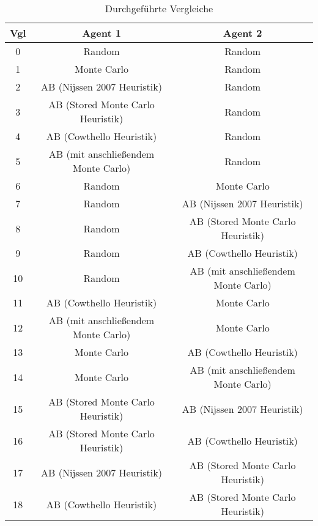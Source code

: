 \begin{table}[ht]
\begin{adjustbox}{max width=\textwidth}
\begin{tabular}{| c | c | c |} \hline
\ac{Vgl} & Agent 1 & Agent 2 \\ \hline
\hline
0  & Random                              & Random                              \\ \hline
\hline
 1 & Monte Carlo                         & Random                              \\ \hline
 2 & \ac{AB} (Nijssen 2007 Heuristik)         & Random                              \\ \hline
 3 & \ac{AB} (Stored Monte Carlo Heuristik)   & Random                              \\ \hline
 4 & \ac{AB} (Cowthello Heuristik)            & Random                              \\ \hline
 5 & \ac{AB} (mit anschließendem Monte Carlo) & Random                              \\ \hline
\hline
 6 & Random                              & Monte Carlo                         \\ \hline
 7 & Random                              & \ac{AB} (Nijssen 2007 Heuristik)         \\ \hline
 8 & Random                              & \ac{AB} (Stored Monte Carlo Heuristik)   \\ \hline
 9 & Random                              & \ac{AB} (Cowthello Heuristik)            \\ \hline
10 & Random                              & \ac{AB} (mit anschließendem Monte Carlo) \\ \hline
\hline
11 & \ac{AB} (Cowthello Heuristik)            & Monte Carlo                         \\ \hline
12 & \ac{AB} (mit anschließendem Monte Carlo) & Monte Carlo                         \\ \hline
13 & Monte Carlo                         & \ac{AB} (Cowthello Heuristik)            \\ \hline
14 & Monte Carlo                         & \ac{AB} (mit anschließendem Monte Carlo) \\ \hline
\hline
15 & \ac{AB} (Stored Monte Carlo Heuristik)   & \ac{AB} (Nijssen 2007 Heuristik)    \\ \hline
16 & \ac{AB} (Stored Monte Carlo Heuristik)   & \ac{AB} (Cowthello Heuristik)       \\ \hline
17 & \ac{AB} (Nijssen 2007 Heuristik)    & \ac{AB} (Stored Monte Carlo Heuristik)   \\ \hline
18 & \ac{AB} (Cowthello Heuristik)       & \ac{AB} (Stored Monte Carlo Heuristik)   \\ \hline
\end{tabular}
\end{adjustbox}
\caption{Durchgeführte Vergleiche}
\label{tbl:cmp-agents}
%
\end{table}

